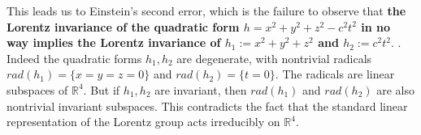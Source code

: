 \documentclass[12pt]{amsart}
\newtheorem*{thm}{Theorem}
\newcommand{\bR}{\mathbb{R}}
\newcommand{\del}{\partial}
\newcommand{\sC}{\mathscr{C}}
\begin{document}
This leads us to Einstein's second error, which is the failure to observe that \textbf{the Lorentz invariance of the quadratic form $h=x^2+y^2+z^2-c^2t^2$ in no way implies the Lorentz invariance of $h_1:=x^2+y^2+z^2$ and $h_2:=c^2 t^2.$ }. Indeed the quadratic forms $h_1, h_2$ are degenerate, with nontrivial radicals $rad(h_1)=\{x=y=z=0\}$ and $rad(h_2)=\{t=0\}.$ The radicals are linear subspaces of $\bR^4$. But if $h_1, h_2$ are invariant, then $rad(h_1)$ and $rad(h_2)$ are also nontrivial invariant subspaces. This contradicts the fact that the standard linear representation of the Lorentz group acts irreducibly on $\bR^4$.
















\end{document}
